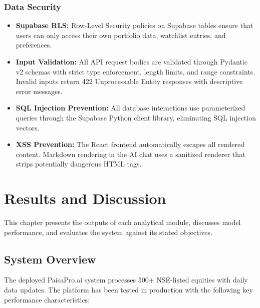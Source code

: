 \documentclass[12pt, a4paper, oneside]{report}
\newcommand{\projectname}{PaisaPro.ai}
\begin{document}
\subsection{Data Security}

\begin{itemize}[nosep]
    \item \textbf{Supabase RLS:} Row-Level Security policies on Supabase tables ensure that users can only access their own portfolio data, watchlist entries, and preferences.
    \item \textbf{Input Validation:} All API request bodies are validated through Pydantic v2 schemas with strict type enforcement, length limits, and range constraints. Invalid inputs return 422 Unprocessable Entity responses with descriptive error messages.
    \item \textbf{SQL Injection Prevention:} All database interactions use parameterized queries through the Supabase Python client library, eliminating SQL injection vectors.
    \item \textbf{XSS Prevention:} The React frontend automatically escapes all rendered content. Markdown rendering in the AI chat uses a sanitized renderer that strips potentially dangerous HTML tags.
\end{itemize}


\chapter{Results and Discussion}
\label{chap:results}

This chapter presents the outputs of each analytical module, discusses model performance, and evaluates the system against its stated objectives.

\section{System Overview}
\label{sec:results_overview}

The deployed \projectname{} system processes 500+ NSE-listed equities with daily data updates. The platform has been tested in production with the following key performance characteristics:
\end{document}
